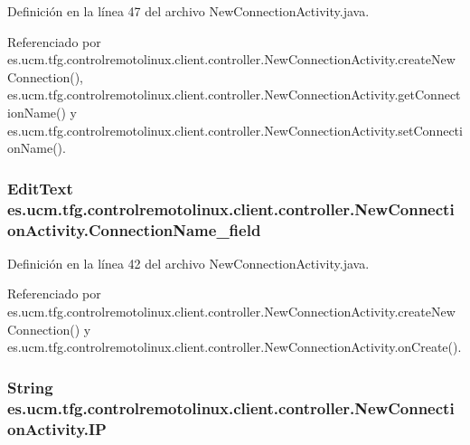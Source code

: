 Definición en la línea 47 del archivo New\-Connection\-Activity.\-java.



Referenciado por es.\-ucm.\-tfg.\-controlremotolinux.\-client.\-controller.\-New\-Connection\-Activity.\-create\-New\-Connection(), es.\-ucm.\-tfg.\-controlremotolinux.\-client.\-controller.\-New\-Connection\-Activity.\-get\-Connection\-Name() y es.\-ucm.\-tfg.\-controlremotolinux.\-client.\-controller.\-New\-Connection\-Activity.\-set\-Connection\-Name().

\hypertarget{classes_1_1ucm_1_1tfg_1_1controlremotolinux_1_1client_1_1controller_1_1NewConnectionActivity_aefa6cbc06ef7ed6c09583aac36a10a5d}{
\subsubsection[{Connection\-Name\-\_\-field}]{\setlength{\rightskip}{0pt plus 5cm}Edit\-Text es.\-ucm.\-tfg.\-controlremotolinux.\-client.\-controller.\-New\-Connection\-Activity.\-Connection\-Name\-\_\-field\hspace{0.3cm}{\ttfamily [private]}}}\label{classes_1_1ucm_1_1tfg_1_1controlremotolinux_1_1client_1_1controller_1_1NewConnectionActivity_aefa6cbc06ef7ed6c09583aac36a10a5d}


Definición en la línea 42 del archivo New\-Connection\-Activity.\-java.



Referenciado por es.\-ucm.\-tfg.\-controlremotolinux.\-client.\-controller.\-New\-Connection\-Activity.\-create\-New\-Connection() y es.\-ucm.\-tfg.\-controlremotolinux.\-client.\-controller.\-New\-Connection\-Activity.\-on\-Create().

\hypertarget{classes_1_1ucm_1_1tfg_1_1controlremotolinux_1_1client_1_1controller_1_1NewConnectionActivity_a6f16e095078c88a12c58b2e9c949e0a7}{
\subsubsection[{I\-P}]{\setlength{\rightskip}{0pt plus 5cm}String es.\-ucm.\-tfg.\-controlremotolinux.\-client.\-controller.\-New\-Connection\-Activity.\-I\-P\hspace{0.3cm}{\ttfamily [private]}}}\label{classes_1_1ucm_1_1tfg_1_1controlremotolinux_1_1client_1_1controller_1_1NewConnectionActivity_a6f16e095078c88a12c58b2e9c949e0a7}


